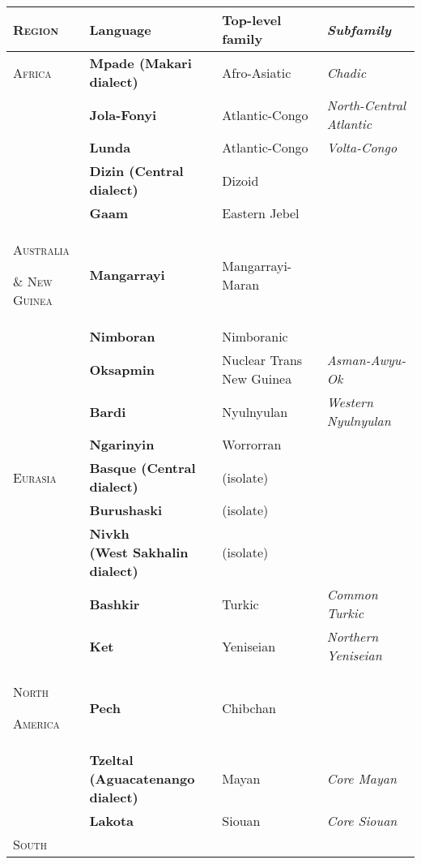 \documentclass[12pt]{article}
\begin{document}
\clearpage\begin{flushleft}
\tablefirsthead{}
\tablehead{}
\tabletail{}
\tablelasttail{}
\begin{supertabular}{m{1.2205598in}m{1.6719599in}m{1.6400598in}m{1.6420599in}}
\hline
{\bfseries\scshape Region} &
{\bfseries Language} &
{\bfseries Top-level family} &
{\bfseries\itshape Subfamily}\\\hline
{\scshape Africa} &
{\bfseries Mpade (Makari dialect)} &
Afro-Asiatic &
{\itshape Chadic}\\\hhline{-~~~}
 &
{\bfseries Jola-Fonyi} &
Atlantic-Congo &
{\itshape North-Central Atlantic}\\
 &
{\bfseries Lunda} &
Atlantic-Congo &
{\itshape Volta-Congo}\\
 &
{\bfseries Dizin (Central dialect)} &
Dizoid &
\\
 &
{\bfseries Gaam} &
Eastern Jebel &
\\\hline
{\scshape Australia }

{\scshape \& New Guinea} &
{\bfseries Mangarrayi} &
Mangarrayi-Maran &
\\\hhline{-~~~}
 &
{\bfseries Nimboran} &
Nimboranic &
\\
 &
{\bfseries Oksapmin} &
Nuclear Trans New Guinea &
{\itshape Asman-Awyu-Ok}\\
 &
{\bfseries Bardi} &
Nyulnyulan &
{\itshape Western Nyulnyulan}\\
 &
{\bfseries Ngarinyin} &
Worrorran &
\\\hline
{\scshape Eurasia} &
{\bfseries Basque (Central dialect)} &
(isolate) &
\\\hhline{-~~~}
 &
{\bfseries Burushaski} &
(isolate) &
\\
 &
{\bfseries Nivkh \newline
(West Sakhalin dialect)} &
(isolate) &
\\
 &
{\bfseries Bashkir} &
Turkic &
{\itshape Common Turkic}\\
 &
{\bfseries Ket} &
Yeniseian &
{\itshape Northern Yeniseian}\\\hline
{\scshape North }

{\scshape America} &
{\bfseries Pech} &
Chibchan &
\\\hhline{-~~~}
 &
{\bfseries Tzeltal \newline
(Aguacatenango dialect)} &
Mayan &
{\itshape Core Mayan}\\
 &
{\bfseries Lakota} &
Siouan &
{\itshape Core Siouan}\\\hline
{\scshape South }


\end{supertabular}
\end{flushleft}
\end{document}

